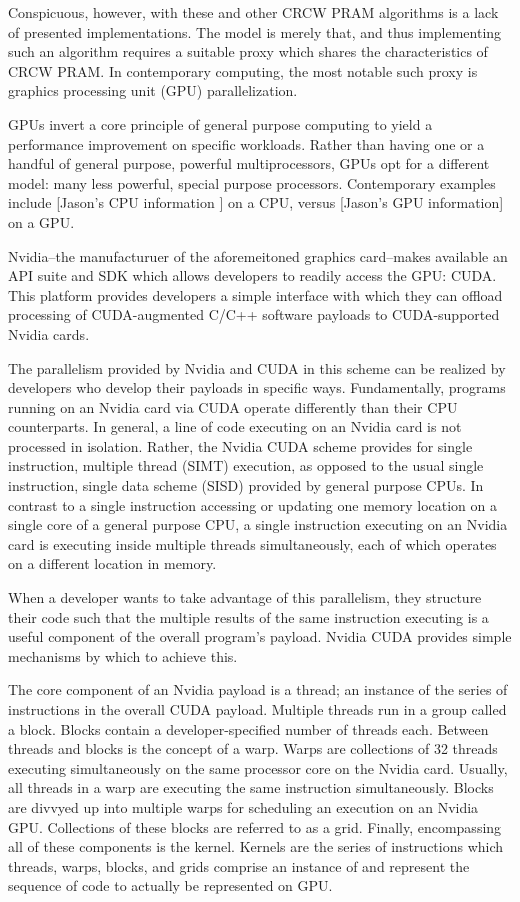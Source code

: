\documentclass[letterpaper, 12pt]{article}
\begin{document}
Conspicuous, however, with these and other CRCW PRAM algorithms is a lack of presented implementations.  The model is merely that, and thus implementing such an algorithm requires a suitable proxy which shares the characteristics of CRCW PRAM.  In contemporary computing, the most notable such proxy is graphics processing unit (GPU) parallelization.

GPUs invert a core principle of general purpose computing to yield a performance improvement on specific workloads.  Rather than having one or a handful of general purpose, powerful multiprocessors, GPUs opt for a different model: many less powerful, special purpose processors.  Contemporary examples include [Jason's CPU information ] on a CPU, versus [Jason's GPU information] on a GPU.  

Nvidia--the manufacturuer of the aforemeitoned graphics card--makes available an API suite and SDK which allows developers to readily access the GPU: CUDA.  This platform provides developers a simple interface with which they can offload processing of CUDA-augmented C/C++ software payloads to CUDA-supported Nvidia cards.

The parallelism provided by Nvidia and CUDA in this scheme can be realized by developers who develop their payloads in specific ways.  Fundamentally, programs running on an Nvidia card via CUDA operate differently than their  CPU counterparts.  In general, a line of code executing on an Nvidia card is not processed in isolation.  Rather, the Nvidia CUDA scheme provides for single instruction, multiple thread (SIMT) execution, as opposed to the usual single instruction, single data scheme (SISD) provided by general purpose CPUs.  In contrast to a single instruction accessing or updating one memory location on a single core of a general purpose CPU, a single instruction executing on an Nvidia card is executing inside multiple threads simultaneously, each of which operates on a different location in memory.

When a developer wants to take advantage of this parallelism, they structure their code such that the multiple results of the same instruction executing is a useful component of the overall program's payload.  Nvidia CUDA provides simple mechanisms by which to achieve this.

The core component of an Nvidia payload is a thread; an instance of the series of instructions in the overall CUDA payload.  Multiple threads run in a group called a block.  Blocks contain a developer-specified number of threads each.  Between threads and blocks is the concept of a warp.  Warps are collections of 32 threads executing simultaneously on the same processor core on the Nvidia card.  Usually, all threads in a warp are executing the same instruction simultaneously.  Blocks are divvyed up into multiple warps for scheduling an execution on an Nvidia GPU.  Collections of these blocks are referred to as a grid.  Finally, encompassing all of these components is the kernel.  Kernels are the series of instructions which threads, warps, blocks, and grids comprise an instance of and represent the sequence of code to actually be represented on GPU.
\end{document}

